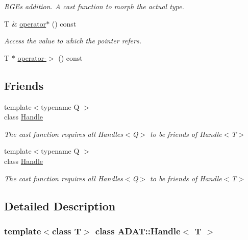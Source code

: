\begin{DoxyCompactItemize}
\begin{DoxyCompactList}\small\item\em R\+GE\textquotesingle{}s addition. A cast function to morph the actual type. \end{DoxyCompactList}\item 
T \& \mbox{\hyperlink{classADAT_1_1Handle_a86f851b3a2e8a6084e50bfad306260f4}{operator$\ast$}} () const
\begin{DoxyCompactList}\small\item\em Access the value to which the pointer refers. \end{DoxyCompactList}\item 
T $\ast$ \mbox{\hyperlink{classADAT_1_1Handle_ad58ef1e032066f7d6b01c2a76cfac5e4}{operator-\/$>$}} () const
\end{DoxyCompactItemize}
\subsection*{Friends}
\begin{DoxyCompactItemize}
\item 
{\footnotesize template$<$typename Q $>$ }\\class \mbox{\hyperlink{classADAT_1_1Handle_a67ca1a2d91273eaf85fb3d23ba8ce984}{Handle}}
\begin{DoxyCompactList}\small\item\em The cast function requires all Handles$<$\+Q$>$ to be friends of Handle$<$\+T$>$ \end{DoxyCompactList}\item 
{\footnotesize template$<$typename Q $>$ }\\class \mbox{\hyperlink{classADAT_1_1Handle_a7b22116ca951d48056220c7ad9620e85}{Handle}}
\begin{DoxyCompactList}\small\item\em The cast function requires all Handles$<$\+Q$>$ to be friends of Handle$<$\+T$>$ \end{DoxyCompactList}\end{DoxyCompactItemize}


\subsection{Detailed Description}
\subsubsection*{template$<$class T$>$\newline
class A\+D\+A\+T\+::\+Handle$<$ T $>$}

